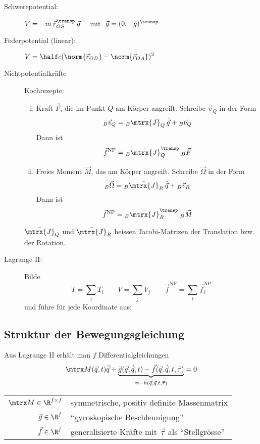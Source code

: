 		\begin{description}
			\item[Schwerepotential:] $\displaystyle V = -m \: \vec r_{OS}^\transp \: \vec g \quad$ mit $\ \vec g = (0,-g)^\transp$
			\item[Federpotential (linear):] $\displaystyle V = \half c (\norm{\vec r_{OB}} - \norm{\vec r_{OA}})^2$
			\item[Nichtpotentialkräfte] Kochrezepte:
				\begin{enumerate}[(i)]
					\item Kraft $\vec F$, die im Punkt $Q$ am Körper angreift. Schreibe $\vec v_Q$ in der Form
						\[
							{}_B \vec v_Q = {}_B \bar{\mtrx{J}}_Q \: \dot{\vec q} + {}_B \vec \nu_Q
						\]
						Dann ist
						\[
							\vec f^\text{NP} = {}_B \bar{\mtrx{J}}_Q^\transp \: {}_B \vec F
						\]
					
					\item Freies Moment $\vec M$, das am Körper angreift. Schreibe $\vec\Omega$ in der Form
						\[
							{}_B \vec\Omega = {}_B \bar{\mtrx{J}}_R \: \dot{\vec q} + {}_B \vec v_R
						\]
						Dann ist
						\[
							\vec f^\text{NP} = {}_B \bar{\mtrx{J}}_R^\transp \: {}_B \vec M
						\]
				\end{enumerate}
				
				$\bar{\mtrx{J}}_Q$ und $\bar{\mtrx{J}}_R$ heissen Jacobi-Matrizen der Translation bzw. der Rotation.
				
				\item[Lagrange II:] Bilde
					\[
						T = \sum_i T_i \qquad V = \sum_j V_j \qquad \vec f^\text{NP} = \sum_l \vec f^\text{NP}_l
					\]
					und führe für jede Koordinate aus:
		\end{description}
	
	\subsection{Struktur der Bewegungsgleichung} %
		Aus Lagrange II erhält man $f$ Differentialgleichungen
		\[
			\mtrx M(\vec q, t) \ddot{\vec q} + \underbrace{
				\vec g(\vec q, \dot{\vec q}, t) - \vec f(\vec q, \dot{\vec q}, t, \vec \tau)
			}_{= -\vec h(\vec q, \dot{\vec q}, t, \vec \tau)} = 0
		\]
		\begin{tabular}{r@{:\quad}l}
			$\mtrx M \in \R^{f \times f}$ & symmetrische, positiv definite Massenmatrix \\
			$\vec g \in \R^f$ & ``gyroskopische Beschleunigung'' \\
			$\vec f \in \R^f$ & generalisierte Kräfte mit $\vec \tau$ als ``Stellgrösse''
		\end{tabular}
		
